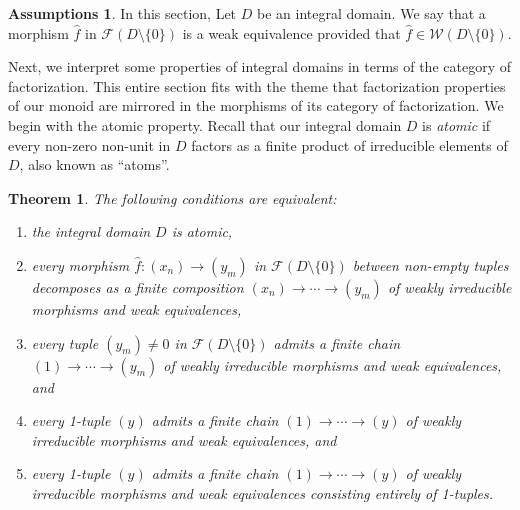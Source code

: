 \documentclass[reqno]{amsart}
\theoremstyle{plain}
\newtheorem{thm}[lem]{Theorem}
\theoremstyle{definition}
\newtheorem*{assumptions}{Assumptions}
\newcommand{\cat}[1]{\mathcal{#1}}
\newcommand{\catw}{\cat{W}}
\newcommand{\catf}{\cat{F}}
\newcommand{\emptytuple}{\mathfrak{0}}
\numberwithin{equation}{lem}
\begin{document}
\begin{assumptions}
In this section, Let $D$ be an integral domain.
We say that a morphism $\hat f$ in $\catf(D\setminus\{0\})$ is a weak equivalence provided that $\hat f\in\catw(D\setminus\{0\})$.
\end{assumptions}

Next,
we interpret some properties of integral domains  in terms of the category of factorization.
This entire section fits with the theme that factorization properties of our monoid are mirrored in the morphisms of its
category of factorization.
We begin
with the atomic property.
Recall that our integral domain $D$ is \emph{atomic} if every non-zero non-unit in $D$ factors as a finite product of 
irreducible elements of $D$, also known as ``atoms''.

\begin{thm}\label{prop170503a}
The following conditions are equivalent:
\begin{enumerate}[\rm(i)]
\item\label{prop170503a1}
the 
integral
domain $D$ is atomic,
\item\label{prop170503a2'}
every morphism $\hat f\colon (x_n)\to(y_m)$ in $\catf(D \setminus \{0\})$ between non-empty tuples decomposes as a finite composition
$(x_n)\to\cdots\to(y_m)$ of 
weakly
irreducible morphisms and weak equivalences,
\item\label{prop170503a2}
every tuple $(y_m)
\neq\emptytuple$ in $\catf(D \setminus \{0\})$ admits a finite chain
$(1)\to\cdots\to(y_m)$ of 
weakly
irreducible morphisms and weak equivalences, and
\item\label{prop170503a3}
every 1-tuple $(y)$ admits a finite chain
$(1)\to\cdots\to(y)$ of 
weakly
irreducible morphisms and weak equivalences, 
and
\item\label{prop170503a3'}
every 1-tuple $(y)$ admits a finite chain
$(1)\to\cdots\to(y)$ of 
weakly
irreducible morphisms and weak equivalences consisting entirely of 1-tuples.
\end{enumerate}
\end{thm}
\end{document}
